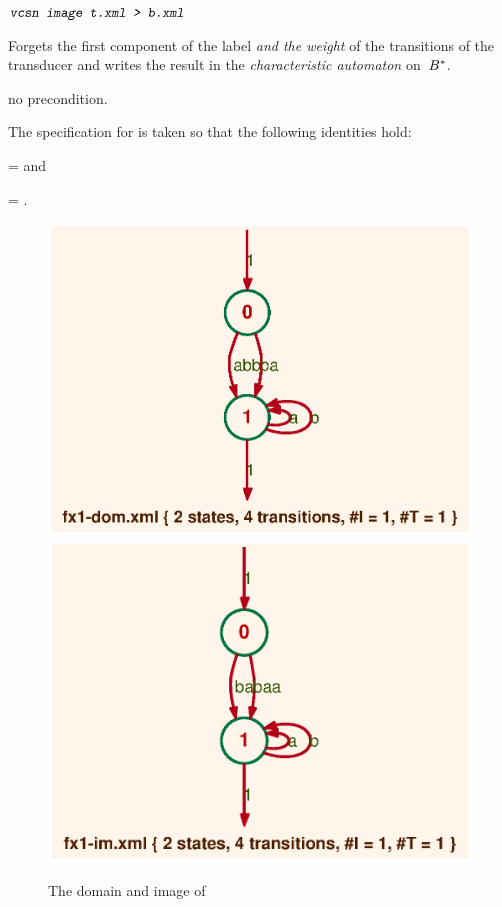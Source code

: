 \medskip\medskip 
\begin{SwClCmd}
\begin{shell}
$ \textsl{\texttt{vcsn image t.xml > b.xml}}
$
\end{shell}%
\end{SwClCmd}%
\begin{SwClTxt}
    Forgets the first component of the label \emph{and the weight} of the 
    transitions of the transducer  
     and writes the result in the \emph{characteristic automaton}
     on~${{B}^{*}}$. 
\end{SwClTxt}%


\Prec no precondition.

\Comt
The specification for  is taken so that the 
following identities hold:

\noindent 
{} = 
\e
and

\noindent 
{} = .

\begin{figure}[ht]
    \centering
\includegraphics[scale=0.5]{figures/fx1-dom.ps}
\ee
\includegraphics[scale=0.5]{figures/fx1-im.ps}
\caption{The domain and image of }
\label{fig:dom-im}
\end{figure}

